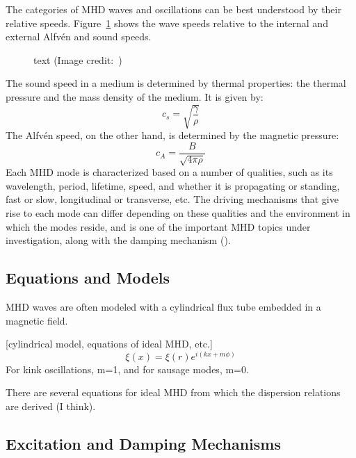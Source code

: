 \documentclass[preprint2]{aastex}
\begin{document}
The categories of MHD waves and oscillations can be best understood
by their relative speeds. Figure~\ref{speeds} shows the wave speeds relative
to the internal and external Alfv\'en and sound speeds.

\begin{figure}[ht]
    \caption{text (Image credit:~\cite{Nak})}
    \label{speeds}
\end{figure}

The sound speed in a medium is determined by thermal properties:
the thermal pressure and the mass density of the medium.
It is given by:
\begin{equation}\label{sound_speed}
    c_s = \sqrt{\frac{\gamma }{\rho}}
\end{equation}
The Alfv\'en speed, on the other hand, is determined by the magnetic
pressure:
\begin{equation}\label{Alfven_speed}
    c_A = \frac{B}{\sqrt{4\pi\rho}}
\end{equation}
Each MHD mode is characterized based on a number of qualities, such
as its wavelength, period, lifetime, speed, and
whether it is propagating or standing, fast or slow, longitudinal
or transverse, etc. The driving mechanisms that give rise to each mode
can differ depending on these qualities and the environment in which
the modes reside, and is one of the important MHD topics under investigation,
along with the damping mechanism (\cite{kink_1}).

\subsection{Equations and Models}
MHD waves are often modeled with a cylindrical flux tube embedded
in a magnetic field.

[cylindrical model, equations of ideal MHD, etc.]
\begin{equation}
 \xi(x) = \xi(r)e^{i(kx+m\phi)}
\end{equation}
For kink oscillations, m=1, and for sausage modes, m=0.

There are several equations for ideal MHD from which the dispersion
relations are derived (I think).
\subsection{Excitation and Damping Mechanisms}
\end{document}
